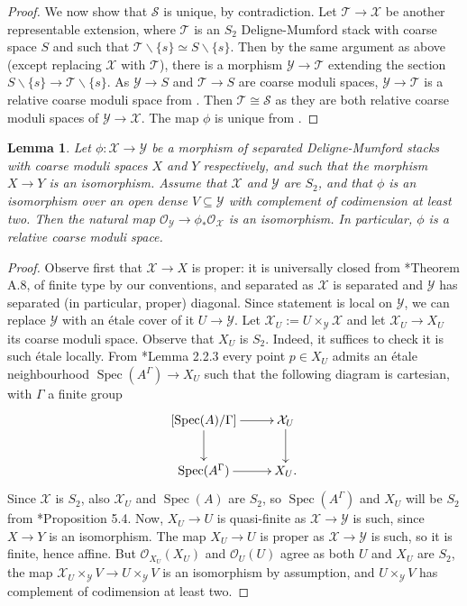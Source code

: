 \documentclass{amsart}
\newcommand{\cO}{\mathcal{O}}
\newcommand{\cS}{\mathcal{S}}
\newcommand{\cT}{\mathcal{T}}
\newcommand{\cX}{\mathcal{X}}
\newcommand{\cY}{\mathcal{Y}}
\newcommand{\spec}{\operatorname{Spec}}
\newtheorem{Lemma}[theorem]{Lemma}
\theoremstyle{definition}
\theoremstyle{definition}
\begin{document}
{\begin{proof}
We now show that $\cS$ is unique, by contradiction. Let $\cT\to \cX$ be another representable extension, where $\cT$ is an $S_2$ Deligne-Mumford stack with coarse space $S$ and such that $\cT\smallsetminus\{s\}\simeq S\smallsetminus\{s\}$. Then by the same argument as above (except replacing $\cX$ with $\cT$), there is a morphism $\cY\to\cT$ extending the section $S\smallsetminus\{s\}\to \cT\smallsetminus\{s\}$. As $\cY\to S$ and $\cT\to S$ are coarse moduli spaces, $\cY\to \cT$ is a relative coarse moduli space from . Then $\cT\cong \cS$ as they are both relative coarse moduli spaces of $\cY\to \cX$. 
The map $\phi$ is unique from .
\end{proof}
\begin{Lemma}\label{lemma_map_between_S2_DM_stacks_that_is_isom_in_condim_1_with_same_cms_is_relative_cms}
    {Let $\phi:\cX\to \cY$ be a morphism of separated Deligne-Mumford stacks with coarse moduli spaces $X$ and $Y$ respectively, and such that the morphism $X\to Y$ is an isomorphism. Assume that $\cX$ and $\cY$ are $S_2$, and that $\phi$ is an isomorphism over an open dense $V\subseteq \cY$ with complement of codimension at least two. Then the natural map $\cO_\cY\to \phi_*\cO_\cX$ is an isomorphism. In particular, $\phi$ is a relative coarse moduli space.} 
\end{Lemma}
\begin{proof}
{Observe first that $\cX\to X$ is proper: it is universally closed from \cite{AHH}*{Theorem A.8}, of finite type by our conventions, and separated as $\cX$ is separated and $\cY$ has separated (in particular, proper) diagonal.
Since statement is local on $\cY$, we can replace $\cY$ with an \'etale cover of it $U\to \cY$. Let $\cX_U:=U\times_\cY \cX$ and let $\cX_U\to X_U$ its coarse moduli space. Observe that $X_U$ is $S_2$. Indeed, it suffices to check it is such \'etale locally. From \cite{AV_compactifying}*{Lemma 2.2.3} every point $p\in X_U$ admits an \'etale neighbourhood $\spec(A^\Gamma)\to X_U$ such that the following diagram is cartesian, with $\Gamma$ a finite group \[\xymatrix{[\spec(A)/\Gamma]\ar[r] \ar[d] & \cX_U \ar[d] \\ \spec(A^\Gamma)\ar[r] &X_U.}\] Since $\cX$ is $S_2$, also $\cX_U$ and $\spec(A)$ are $S_2$,
so $\spec(A^\Gamma)$ and $X_U$ will be $S_2$ from \cite{KM98}*{Proposition 5.4}. Now, $X_U\to U$ is quasi-finite as $\cX\to \cY$ is such, since $X\to Y$ is an isomorphism. The map $X_U\to U$ is proper as $\cX\to \cY$ is such, so it is finite, hence affine. But $\cO_{X_U}(X_U)$ and $\cO_U(U)$ agree as both $U$ and $X_U$ are $S_2$, the map $\cX_U \times_\cY V\to U\times_\cY V$ is an isomorphism by assumption, and $U\times_\cY V$ has complement of codimension at least two.}

\end{proof}}
\end{document}
